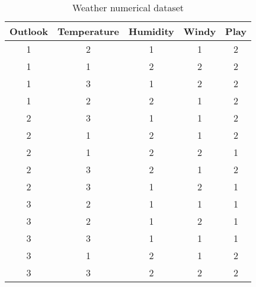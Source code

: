 \begin{table}[]
	\renewcommand{\arraystretch}{1.3}
	\caption{Weather numerical dataset}
	\label{tbl:weather_numerical_dataset}
	\centering
	\begin{tabular}{|c|c|c|c||c|}
		\hline
		Outlook  & Temperature & Humidity & Windy & Play \\ \hline \hline
		1 &  2 &  1  &  1 & 2 \\ \hline
		1 &  1 &  2  &  2 & 2 \\ \hline
		1 &  3 &  1  &  2 & 2 \\ \hline
		1 &  2 &  2  &  1 & 2 \\ \hline
		2 &  3 &  1  &  1 & 2 \\ \hline
		2 &  1 &  2  &  1 & 2 \\ \hline
		2 &  1 &  2  &  2 & 1 \\ \hline
		2 &  3 &  2  &  1 & 2 \\ \hline
		2 &  3 &  1  &  2 & 1 \\ \hline
		3 &  2 &  1  &  1 & 1 \\ \hline
		3 &  2 &  1  &  2 & 1 \\ \hline
		3 &  3 &  1  &  1 & 1 \\ \hline
		3 &  1 &  2  &  1 & 2 \\ \hline
		3 &  3 &  2  &  2 & 2 \\ \hline
	\end{tabular}
\end{table}

